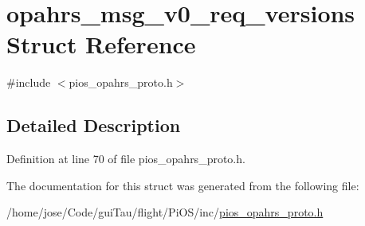 \hypertarget{structopahrs__msg__v0__req__versions}{\section{opahrs\-\_\-msg\-\_\-v0\-\_\-req\-\_\-versions Struct Reference}
\label{structopahrs__msg__v0__req__versions}
}


{\ttfamily \#include $<$pios\-\_\-opahrs\-\_\-proto.\-h$>$}



\subsection{Detailed Description}


Definition at line 70 of file pios\-\_\-opahrs\-\_\-proto.\-h.



The documentation for this struct was generated from the following file\-:\begin{DoxyCompactItemize}
\item 
/home/jose/\-Code/gui\-Tau/flight/\-Pi\-O\-S/inc/\hyperlink{pios__opahrs__proto_8h}{pios\-\_\-opahrs\-\_\-proto.\-h}\end{DoxyCompactItemize}
